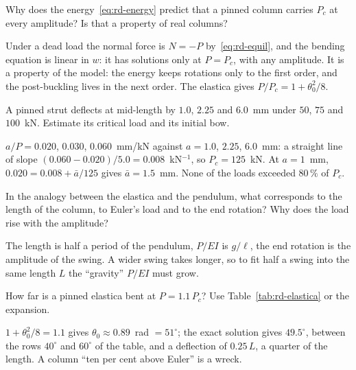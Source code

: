 \label{exo:rd-flat}
%
Why does the energy~\eqref{eq:rd-energy} predict that a pinned column carries $P_c$ at every
amplitude? Is that a property of real columns?
\begin{solution}
Under a dead load the normal force is $N = -P$ by~\eqref{eq:rd-equil}, and the bending equation is
linear in $w$: it has solutions only at $P = P_c$, with any amplitude. It is a property of the
model: the energy keeps rotations only to the first order, and the post-buckling lives in the
next order. The elastica gives $P/P_c = 1 + \theta_0^2/8$.
\end{solution}

\label{exo:rd-southwell}
%
A pinned strut deflects at mid-length by $1.0$, $2.25$ and $6.0$~mm under $50$, $75$ and $100$~kN.
Estimate its critical load and its initial bow.
\begin{solution}
$a/P = 0.020$, $0.030$, $0.060$~mm/kN against $a = 1.0$, $2.25$, $6.0$~mm: a straight line of slope
$(0.060 - 0.020)/5.0 = 0.008$~kN$^{-1}$, so $P_c = 125$~kN. At $a = 1$~mm, $0.020 = 0.008 + \bar a/125$
gives $\bar a = 1.5$~mm. None of the loads exceeded $80\,\%$ of $P_c$.
\end{solution}

\label{exo:rd-pendulum}
%
In the analogy between the elastica and the pendulum, what corresponds to the length of the
column, to Euler's load and to the end rotation? Why does the load rise with the amplitude?
\begin{solution}
The length is half a period of the pendulum, $P/EI$ is $g/\ell$, the end rotation is the
amplitude of the swing. A wider swing takes longer, so to fit half a swing into the same length
$L$ the ``gravity'' $P/EI$ must grow.
\end{solution}

\label{exo:rd-ten}
%
How far is a pinned elastica bent at $P = 1.1\,P_c$? Use Table~\ref{tab:rd-elastica} or the
expansion.
\begin{solution}
$1 + \theta_0^2/8 = 1.1$ gives $\theta_0 \approx 0.89$~rad $= 51^\circ$; the exact solution gives
$49.5^\circ$, between the rows $40^\circ$ and $60^\circ$ of the table, and a deflection of $0.25\,L$, a
quarter of the length. A column ``ten per cent above Euler'' is a wreck.
\end{solution}

